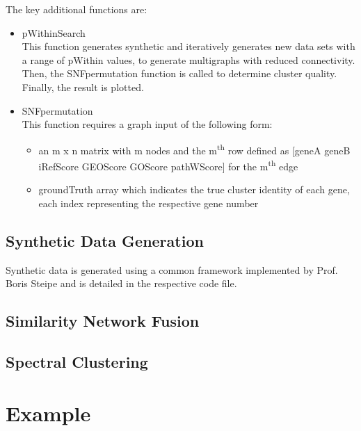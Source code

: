 \documentclass[doublespaced, 12pt]{article}
\begin{document}
The key additional functions are:
\begin{itemize}
	\item pWithinSearch \\ This function generates synthetic and iteratively generates new data sets with a range of pWithin values, to generate multigraphs with reduced connectivity. Then, the SNFpermutation function is called to determine cluster quality. Finally, the result is plotted.
	\item SNFpermutation \\ This function requires a graph input of the following form: 
	\begin{itemize}
		\item an m x n matrix with m nodes and the m\textsuperscript{th} row defined as [geneA geneB iRefScore GEOScore GOScore pathWScore] for the m\textsuperscript{th} edge
		\item groundTruth array which indicates the true cluster identity of each gene, each index representing the respective gene number 
	\end{itemize} 
\end{itemize}


\subsection{Synthetic Data Generation}
Synthetic data is generated using a common framework implemented by Prof. Boris Steipe and is detailed in the respective code file.
\subsection{Similarity Network Fusion}

\subsection{Spectral Clustering}

\section{Example}


\end{document}
